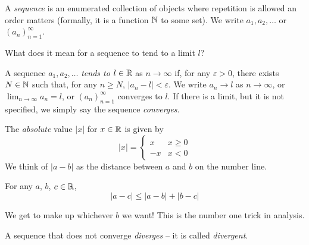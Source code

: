 \documentclass{../template/note}
\begin{document}
    \begin{definition}
        A \emph{sequence} is an enumerated collection of objects where repetition is allowed an order matters (formally, it is a function \(\mathbb N\) to some set). We write \(a_1, a_2, \dots\) or \((a_n)_{n=1}^\infty\).
    \end{definition}
    
    What does it mean for a sequence to tend to a limit \(l\)?

    \begin{definition}
        A sequence \(a_1, a_2, \dots\) \emph{tends to} \(l \in \mathbb R\) as \(n \to \infty\) if, for any \(\varepsilon > 0\), there exists \(N \in \mathbb N\) such that, for any \(n \geq N\), \(|a_n - l| < \varepsilon\). We write \(a_n \to l\) as \(n \to \infty\), or \(\lim_{n \to \infty} a_n = l\), or \((a_n)_{n=1}^\infty\) converges to \(l\). If there is a limit, but it is not specified, we simply say the sequence \emph{converges}.
    \end{definition}
    
    \begin{definition}
        The \emph{absolute} value \(|x|\) for \(x \in \mathbb R\) is given by
        \[  
            |x| = \begin{cases}
                x & x \geq 0 \\
                -x & x < 0
            \end{cases}
        \]
        We think of \(|a-b|\) as the distance between \(a\) and \(b\) on the number line.
    \end{definition}
    
    \begin{theorem}
        For any \(a\), \(b\), \(c \in \mathbb R\),
        \[
            |a-c| \leq |a-b| + |b-c|
        \]
    \end{theorem}
    
    \begin{remark*}
        We get to make up whichever \(b\) we want! This is the number one trick in analysis.
    \end{remark*}
    
    \begin{definition}
        A sequence that does not converge \emph{diverges} -- it is called \emph{divergent}.
    \end{definition}
    
\end{document}
